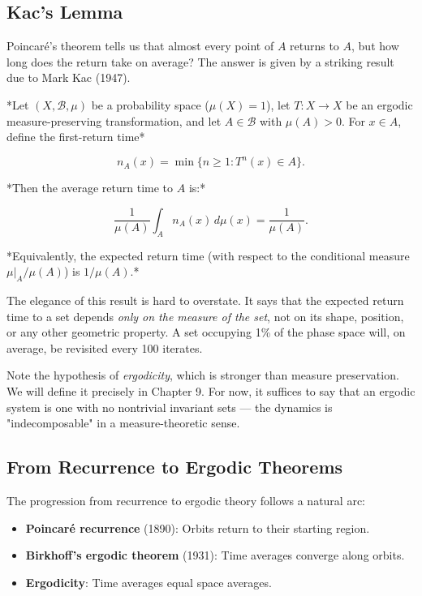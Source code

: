 \subsection{Kac's Lemma}\label{sec:4.5.1}

Poincaré's theorem tells us that almost every point of $A$ returns to $A$, but how long does the return take on average? The answer is given by a striking result due to Mark Kac (1947).

\begin{theorem}\label{thm:4.9}
*Let $(X, \mathcal{B}, \mu)$ be a probability space ($\mu(X) = 1$), let $T: X \to X$ be an ergodic measure-preserving transformation, and let $A \in \mathcal{B}$ with $\mu(A) > 0$. For $x \in A$, define the first-return time*

\[
n_A(x) = \min\{n \geq 1 : T^n(x) \in A\}.
\]

*Then the average return time to $A$ is:*

\[
\frac{1}{\mu(A)} \int_A n_A(x) \, d\mu(x) = \frac{1}{\mu(A)}.
\]

*Equivalently, the expected return time (with respect to the conditional measure $\mu|_A / \mu(A)$) is $1/\mu(A)$.*

The elegance of this result is hard to overstate. It says that the expected return time to a set depends \textit{only on the measure of the set}, not on its shape, position, or any other geometric property. A set occupying 1\% of the phase space will, on average, be revisited every 100 iterates.

Note the hypothesis of \textit{ergodicity}, which is stronger than measure preservation. We will define it precisely in Chapter 9. For now, it suffices to say that an ergodic system is one with no nontrivial invariant sets --- the dynamics is "indecomposable" in a measure-theoretic sense.
\end{theorem}


\subsection{From Recurrence to Ergodic Theorems}\label{sec:4.5.2}

The progression from recurrence to ergodic theory follows a natural arc:

\begin{itemize}[nosep]
  \item \textbf{Poincaré recurrence} (1890): Orbits return to their starting region.
  \item \textbf{Birkhoff's ergodic theorem} (1931): Time averages converge along orbits.
  \item \textbf{Ergodicity}: Time averages equal space averages.
\end{itemize}

